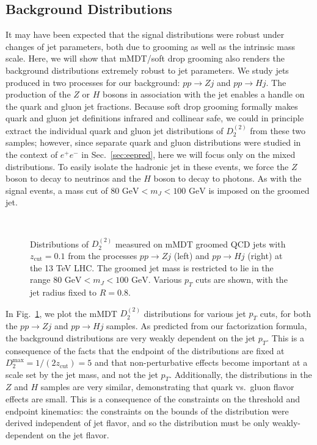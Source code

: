 \documentclass[a4paper,11pt]{article}
\def\zcut{z_{\text{cut}}}
\newcommand{\Dobs}[2]{D_{#1}^{(#2)}}
\DeclareRobustCommand{\Sec}[1]{Sec.~\ref{#1}}
\DeclareRobustCommand{\Fig}[1]{Fig.~\ref{#1}}
\begin{document}
\subsection{Background Distributions}

It may have been expected that the signal distributions were robust under changes of jet parameters, both due to grooming as well as the intrinsic mass scale.  Here, we will show that mMDT/soft drop grooming also renders the background distributions extremely robust to jet parameters.  We study jets produced in two processes for our background: $pp\to Zj$ and $pp\to Hj$.  The production of the $Z$ or $H$ bosons in association with the jet enables a handle on the quark and gluon jet fractions.  Because soft drop grooming formally makes quark and gluon jet definitions infrared and collinear safe, we could in principle extract the individual quark and gluon jet distributions of $\Dobs{2}{2}$ from these two samples; however, since separate quark and gluon distributions were studied in the context of $e^+e^-$ in \Sec{sec:eepred}, here we will focus only on the mixed distributions.  To easily isolate the hadronic jet in these events, we force the $Z$ boson to decay to neutrinos and the $H$ boson to decay to photons.  As with the signal events, a mass cut of $80\text{ GeV} < m_J < 100\text{ GeV}$ is imposed on the groomed jet.

\begin{figure}
\begin{center}
\ \ 
\end{center}
\caption{
Distributions of $\Dobs{2}{2}$ measured on mMDT groomed QCD jets with $\zcut = 0.1$ from the processes $pp\to Zj$ (left) and $pp\to Hj$ (right) at the 13 TeV LHC.  The groomed jet mass is restricted to lie in the range  $80\text{ GeV} < m_J < 100\text{ GeV}$.  Various $p_T$ cuts are shown, with the jet radius fixed to $R= 0.8$.
}
\label{fig:ppjptplots}
\end{figure}

In \Fig{fig:ppjptplots}, we plot the mMDT $\Dobs{2}{2}$ distributions for various jet $p_T$ cuts, for both the $pp\to Zj$ and $pp\to Hj$ samples.  As predicted from our factorization formula, the background distributions are very weakly dependent on the jet $p_T$.  This is a consequence of the facts that the endpoint of the distributions are fixed at $D_2^{\max} = 1/(2\zcut) = 5$ and that non-perturbative effects become important at a scale set by the jet mass, and not the jet $p_T$.  Additionally, the distributions in the $Z$ and $H$ samples are very similar, demonstrating that quark vs.~gluon flavor effects are small.  This is a consequence of the constraints on the threshold and endpoint kinematics: the constraints on the bounds of the distribution were derived independent of jet flavor, and so the distribution must be only weakly-dependent on the jet flavor.
\end{document}
